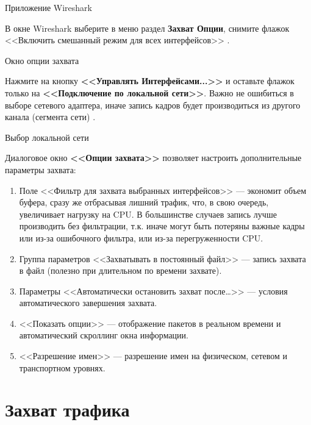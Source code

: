 \begin{image}
	\caption{Приложение Wireshark}
	\label{fig:wireshark}
\end{image}

В окне Wireshark выберите в меню раздел \textbf{Захват \rarrow Опции},
снимите флажок <<Включить смешанный режим для всех интерфейсов>>
.

\begin{image}
	\caption{Окно опции захвата}
	\label{fig:wrsh:capture}
\end{image}

Нажмите на кнопку \textbf{<<Управлять Интерфейсами...>>}
и оставьте флажок только на \textbf{<<Подключение по локальной сети>>}.
Важно не ошибиться в выборе сетевого адаптера,
иначе запись кадров будет производиться из другого канала (сегмента сети)
.

\begin{image}
	\caption{Выбор локальной сети}
	\label{fig:wrsh:capture:local}
\end{image}

Диалоговое окно \textbf{<<Опции захвата>>}
позволяет настроить дополнительные параметры захвата:

\begin{enumerate}
	\item Поле <<Фильтр для захвата выбранных интерфейсов>>
		--- экономит объем буфера, сразу же отбрасывая лишний трафик,
		что, в свою очередь, увеличивает нагрузку на CPU.
		В большинстве случаев запись лучше производить без фильтрации,
		т.к. иначе могут быть потеряны важные кадры
		или из-за ошибочного фильтра, или из-за перегруженности CPU.
	\item Группа параметров <<Захватывать в постоянный файл>>
		--- запись захвата в файл (полезно при длительном по времени захвате).
	\item Параметры <<Автоматически остановить захват после…>>
		--- условия автоматического завершения захвата.
	\item <<Показать опции>> --- отображение пакетов в реальном времени
		и автоматический скроллинг окна информации.
	\item <<Разрешение имен>> --- разрешение имен на физическом,
		сетевом и транспортном уровнях.
\end{enumerate}

\section{Захват трафика}

